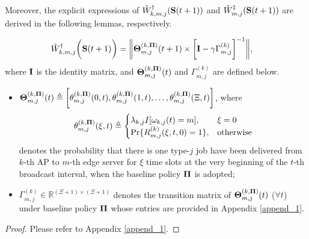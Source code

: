 Moreover, the explicit expressions of $\tilde{W}^{\dagger}_{k,m,j}(\mathbf{S}(t+1))$ and $\tilde{W}^{\ddagger}_{m,j}(\mathbf{S}(t+1))$ are derived in the following lemmas, respectively.

\begin{lemma}
    \label{lemma:w_ap}
    \begin{align}
        &\tilde{W}^{\dagger}_{k,m,j}\bigg(\mathbf{S}(t+1)\bigg) =
        \bigg\|
            \boldsymbol{\Theta}^{(k, \boldsymbol{\Pi})}_{m,j}(t+1) \times
            \bigg[
                \mathbf{I} - \gamma \Gamma^{(k)}_{m,j}
            \bigg]^{-1}
        \bigg\|,
        \label{w_ap}
    \end{align}
    where $\mathbf{I}$ is the identity matrix, and $\boldsymbol{\Theta}^{(k, \boldsymbol{\Pi})}_{m,j}(t)$ and $\Gamma^{(k)}_{m,j}$ are defined below.
    \begin{itemize}
        \item {\small $\boldsymbol{\Theta}^{(k,\boldsymbol{\Pi})}_{m,j}(t) \triangleq \bigg[
            \theta^{(k,\boldsymbol{\Pi})}_{m,j}(0,t),
            \theta^{(k,\boldsymbol{\Pi})}_{m,j}(1,t),
            \dots,
            \theta^{(k,\boldsymbol{\Pi})}_{m,j}(\Xi,t)
            \bigg]$},
        where 
        \begin{align}
            \theta^{(k,\boldsymbol{\Pi})}_{m,j}(\xi,t) \triangleq 
            \begin{cases}
                \lambda_{k,j} I[\omega_{k,j}(t)=m], & \xi=0
                \\
                \Pr\{R^{(k)}_{m,j}(\xi,t,0) = 1\}, & \text{otherwise}
            \end{cases}
        \end{align}
        denotes the probability that there is one type-$j$ job have been delivered from $k$-th AP to $m$-th edge server for $\xi$ time slots at the very beginning of the $t$-th broadcast interval, when the baseline policy $\boldsymbol{\Pi}$ is adopted;
        \item $\Gamma^{(k)}_{m,j} \in \mathbb{R}^{(\Xi+1)\times(\Xi+1)}$ denotes the transition matrix of $\boldsymbol{\Theta}^{(k,\boldsymbol{\Pi})}_{m,j}(t)$ ($\forall t$) under baseline policy $\boldsymbol{\Pi}$ whose entries are provided in Appendix \ref{append_1}.
    \end{itemize}
\end{lemma}
\begin{proof}
    Please refer to Appendix \ref{append_1}.
\end{proof}

